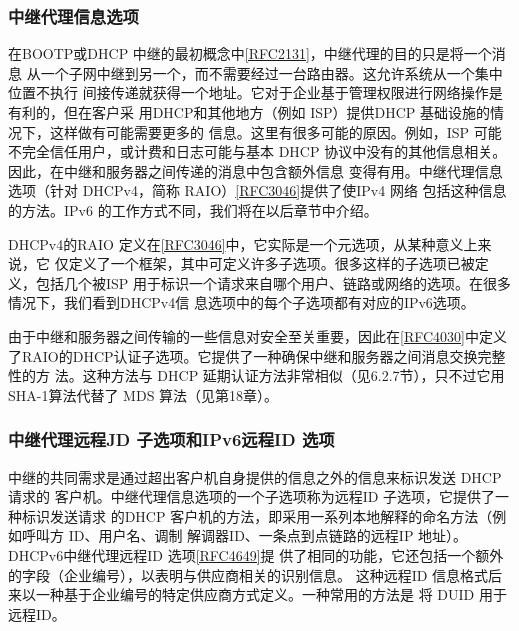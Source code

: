 \subsubsection{中继代理信息选项}
在BOOTP或DHCP 中继的最初概念中\href{https://www.rfc-editor.org/rfc/rfc2131}{\href{https://www.rfc-editor.org/rfc/rfc2131}{[RFC2131]}}，中继代理的目的只是将一个消息
从一个子网中继到另一个，而不需要经过一台路由器。这允许系统从一个集中位置不执行
间接传递就获得一个地址。它对于企业基于管理权限进行网络操作是有利的，但在客户采
用DHCP和其他地方（例如 ISP）提供DHCP 基础设施的情况下，这样做有可能需要更多的
信息。这里有很多可能的原因。例如，ISP 可能不完全信任用户，或计费和日志可能与基本
DHCP 协议中没有的其他信息相关。因此，在中继和服务器之间传递的消息中包含额外信息
变得有用。中继代理信息选项（针对 DHCPv4，简称 RAIO）\href{https://www.rfc-editor.org/rfc/rfc3046}{\href{https://www.rfc-editor.org/rfc/rfc3046}{[RFC3046]}}提供了使IPv4 网络
包括这种信息的方法。IPv6 的工作方式不同，我们将在以后章节中介绍。

DHCPv4的RAIO 定义在\href{https://www.rfc-editor.org/rfc/rfc3046}{\href{https://www.rfc-editor.org/rfc/rfc3046}{[RFC3046]}}中，它实际是一个元选项，从某种意义上来说，它
仅定义了一个框架，其中可定义许多子选项。很多这样的子选项已被定义，包括几个被ISP
用于标识一个请求来自哪个用户、链路或网络的选项。在很多情况下，我们看到DHCPv4信
息选项中的每个子选项都有对应的IPv6选项。

由于中继和服务器之间传输的一些信息对安全至关重要，因此在\href{https://www.rfc-editor.org/rfc/rfc4030}{\href{https://www.rfc-editor.org/rfc/rfc4030}{[RFC4030]}}中定义
了RAIO的DHCP认证子选项。它提供了一种确保中继和服务器之间消息交换完整性的方
法。这种方法与 DHCP 延期认证方法非常相似（见6.2.7节），只不过它用SHA-1算法代替了
MDS 算法（见第18章）。

\subsubsection{中继代理远程JD 子选项和IPv6远程ID 选项}
中继的共同需求是通过超出客户机自身提供的信息之外的信息来标识发送 DHCP 请求的
客户机。中继代理信息选项的一个子选项称为远程ID 子选项，它提供了一种标识发送请求
的DHCP 客户机的方法，即采用一系列本地解释的命名方法（例如呼叫方 ID、用户名、调制
解调器ID、一条点到点链路的远程IP 地址）。DHCPv6中继代理远程ID 选项\href{https://www.rfc-editor.org/rfc/rfc4649}{\href{https://www.rfc-editor.org/rfc/rfc4649}{[RFC4649]}}提
供了相同的功能，它还包括一个额外的字段（企业编号），以表明与供应商相关的识别信息。
这种远程ID 信息格式后来以一种基于企业编号的特定供应商方式定义。一种常用的方法是
将 DUID 用于远程ID。


